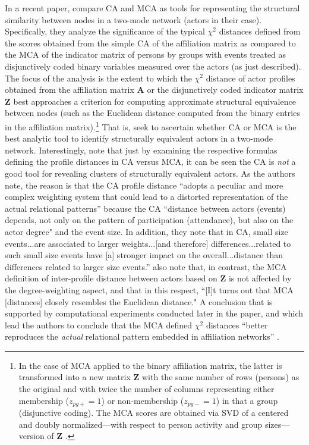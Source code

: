 \documentclass[a4paper,fleqn]{cas-sc}
\begin{document}
In a recent paper, \citet{desposito2014comparison} compare CA and MCA as tools for representing the structural similarity between nodes in a two-mode network (actors in their case). Specifically, they analyze the significance of the typical $\chi^2$ distances defined from the scores obtained from the simple CA of the affiliation matrix as compared to the MCA of the indicator matrix of persons by groups with events treated as disjunctively coded binary variables measured over the actors (as just described). The focus of the analysis is the extent to which the $\chi^2$ distance of actor profiles obtained from the affiliation matrix $\mathbf{A}$ or the disjunctively coded indicator matrix $\mathbf{Z}$ best approaches a criterion for computing approximate structural equivalence between nodes (such as the Euclidean distance computed from the binary entries in the affiliation matrix).\footnote{In the case of MCA applied to the binary affiliation matrix, the latter is transformed into a new matrix $\mathbf{Z}$ with the same number of rows (persons) as the original and with twice the number of columns representing either membership ($z_{pg+} = 1$) or non-membership ($z_{pg-} = 1$) in that a group (disjunctive coding). The MCA scores are obtained via SVD of a centered and doubly normalized---with respect to person activity and group sizes---version of $\mathbf{Z}$ \citep{desposito2014use}.}  That is, \citet{desposito2014comparison} seek to ascertain whether CA or MCA is the best analytic tool to identify structurally equivalent actors in a two-mode network. Interestingly, \citet[115]{desposito2014comparison} note that just by examining the respective formulas defining the profile distances in CA versus MCA, it can be seen the CA is \textit{not} a good tool for revealing clusters of structurally equivalent actors. As the authors note, the reason is that the CA profile distance ``adopts a peculiar and more complex weighting system that could lead to a distorted representation of the actual relational patterns'' because the CA ``distance between actors (events) depends, not only on the pattern of participation (attendance), but also on the actor degree" and the event size. In addition, they note that in CA, small size events...are associated to larger weights...[and therefore] differences...related to such small size events have [a] stronger impact on the overall...distance than differences related to larger size events.'' \citet{desposito2014comparison} also note that, in contrast, the MCA definition of inter-profile distance between actors based on $\mathbf{Z}$ is not affected by the degree-weighting aspect, and that in this respect, ``[I]t turns out that MCA [distances] closely resembles the Euclidean distance." A conclusion that is supported by computational experiments conducted later in the paper, and which lead the authors to conclude that the MCA defined  $\chi^2$ distances ``better reproduces the \textit{actual} relational pattern embedded in affiliation networks'' \citep[122, italics added]{desposito2014comparison}.
\end{document}
